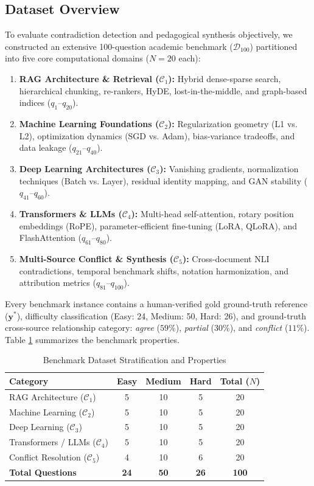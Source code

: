 \documentclass[conference]{IEEEtran}
\begin{document}
\subsection{Dataset Overview}
To evaluate contradiction detection and pedagogical synthesis objectively, we constructed an extensive 100-question academic benchmark ($\mathcal{D}_{100}$) partitioned into five core computational domains ($N=20$ each):
\begin{enumerate}
    \item \textbf{RAG Architecture \& Retrieval ($\mathcal{C}_1$):} Hybrid dense-sparse search, hierarchical chunking, re-rankers, HyDE, lost-in-the-middle, and graph-based indices ($q_1$--$q_{20}$).
    \item \textbf{Machine Learning Foundations ($\mathcal{C}_2$):} Regularization geometry (L1 vs. L2), optimization dynamics (SGD vs. Adam), bias-variance tradeoffs, and data leakage ($q_{21}$--$q_{40}$).
    \item \textbf{Deep Learning Architectures ($\mathcal{C}_3$):} Vanishing gradients, normalization techniques (Batch vs. Layer), residual identity mapping, and GAN stability ($q_{41}$--$q_{60}$).
    \item \textbf{Transformers \& LLMs ($\mathcal{C}_4$):} Multi-head self-attention, rotary position embeddings (RoPE), parameter-efficient fine-tuning (LoRA, QLoRA), and FlashAttention ($q_{61}$--$q_{80}$).
    \item \textbf{Multi-Source Conflict \& Synthesis ($\mathcal{C}_5$):} Cross-document NLI contradictions, temporal benchmark shifts, notation harmonization, and attribution metrics ($q_{81}$--$q_{100}$).
\end{enumerate}

Every benchmark instance contains a human-verified gold ground-truth reference ($\mathbf{y}^*$), difficulty classification (Easy: 24, Medium: 50, Hard: 26), and ground-truth cross-source relationship category: \textit{agree} ($59\%$), \textit{partial} ($30\%$), and \textit{conflict} ($11\%$). Table \ref{tab:dataset_properties} summarizes the benchmark properties.

\begin{table}[htbp]
\caption{Benchmark Dataset Stratification and Properties}
\label{tab:dataset_properties}
\centering
\begin{tabular}{lcccc}
\toprule
\textbf{Category} & \textbf{Easy} & \textbf{Medium} & \textbf{Hard} & \textbf{Total ($N$)} \\
\midrule
RAG Architecture ($\mathcal{C}_1$) & 5 & 10 & 5 & 20 \\
Machine Learning ($\mathcal{C}_2$) & 5 & 10 & 5 & 20 \\
Deep Learning ($\mathcal{C}_3$) & 5 & 10 & 5 & 20 \\
Transformers / LLMs ($\mathcal{C}_4$) & 5 & 10 & 5 & 20 \\
Conflict Resolution ($\mathcal{C}_5$) & 4 & 10 & 6 & 20 \\
\midrule
\textbf{Total Questions} & \textbf{24} & \textbf{50} & \textbf{26} & \textbf{100} \\
\bottomrule
\end{tabular}
\end{table}
\end{document}
